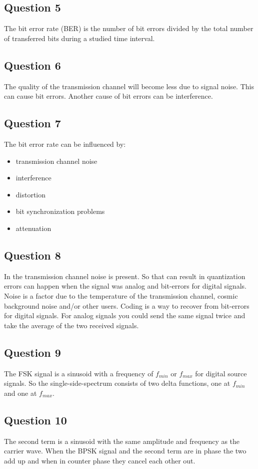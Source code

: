 \documentclass[final]{scrreprt} %
\begin{document}
\subsection{Question 5}
The bit error rate (BER) is the number of bit errors divided by the total number of transferred bits during a studied time interval.
\subsection{Question 6}
The quality of the transmission channel will become less due to signal noise. This can cause bit errors. 
Another cause of bit errors can be interference.
\subsection{Question 7}
The bit error rate can be influenced by:
\begin{itemize}
\item transmission channel noise
\item interference
\item distortion
\item bit synchronization problems
\item attenuation
\end{itemize}
\subsection{Question 8}
In the transmission channel noise is present.
So that can result in quantization errors can happen when the signal was analog and bit-errors for digital signals.
Noise is a factor due to the temperature of the transmission channel, cosmic background noise and/or other users.
Coding is a way to recover from bit-errors for digital signals.
For analog signals you could send the same signal twice and take the average of the two received signals.
\subsection{Question 9}
The FSK signal is a sinusoid with a frequency of $f_{min}$ or $f_{max}$ for digital source signals.
So the single-side-spectrum consists of two delta functions, one at $f_{min}$ and one at $f_{max}$.
\subsection{Question 10}
The second term is a sinusoid with the same amplitude and frequency as the carrier wave. When the BPSK signal and the second term are in phase the two add up and when in counter phase they cancel each other out.
\end{document}
